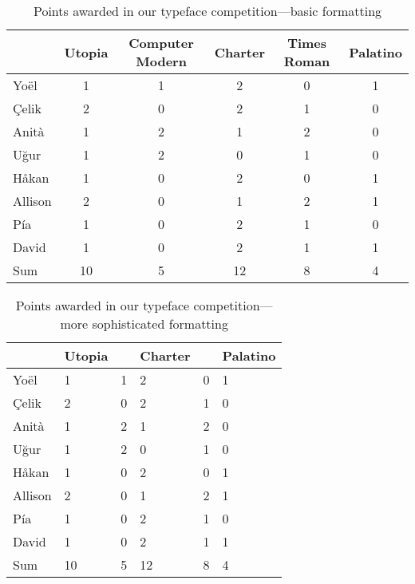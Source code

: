 


\begin{table}[t]
	\caption{Points awarded in our typeface competition---basic formatting}
	\label{tab:basic_formatting}
	\begin{tabular}{@{}lccccc@{}}
		\toprule
					&	Utopia	&	Computer Modern	&	Charter	&	Times Roman	&	Palatino	\\
		\midrule
		Yo\"{e}l	&	1	&	1	&	2	&	0	&	1	\\
		\c{C}elik	&	2	&	0	&	2	&	1	&	0	\\
		Anit\`{a}	&	1	&	2	&	1	&	2	&	0	\\
		U\u{g}ur	&	1	&	2	&	0	&	1	&	0	\\
		H\r{a}kan	&	1	&	0	&	2	&	0	&	1	\\
		Allison		&	2	&	0	&	1	&	2	&	1	\\
		P\'{i}a		&	1	&	0	&	2	&	1	&	0	\\
		David		&	1	&	0	&	2	&	1	&	1	\\
		\midrule
		Sum			&  10	&	5	&	12	&	8	&	4	\\
		\bottomrule
	\end{tabular}
\end{table}

\begin{table}[b]
	\caption{Points awarded in our typeface competition---more sophisticated formatting}
	\label{tab:advanced_formatting}
	\renewcommand\cellalign{ct}
	\begin{tabularx}{\textwidth}{ @{} L *{5}{T{2.0}} }
		\toprule
			&	{Utopia}
			&	{}
			&	{Charter}
			&	{}
			&	{Palatino}
			\\
		\midrule
		Yo\"{e}l  	& 	1	&	1	&	2	&	0	&	1	\\
		\c{C}elik	&	2	&	0	&	2	&	1	&	0	\\
		Anit\`{a}	&	1	&	2	&	1	&	2	&	0	\\
		U\u{g}ur	&	1	&	2	&	0	&	1	&	0	\\
		H\r{a}kan	&	1	&	0	&	2	&	0	&	1	\\
		Allison		&	2	&	0	&	1	&	2	&	1	\\
		P\'ia		&	1	&	0	&	2	&	1	&	0	\\
		David		&	1	&	0	&	2	&	1	&	1	\\
		\midrule
		Sum			&  10	&	5	&	12	&	8	&	4	\\
		\bottomrule
	\end{tabularx}
	\parnotes%
\end{table}